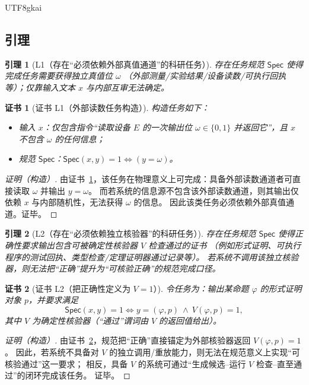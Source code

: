 \documentclass[12pt]{article}
\newtheorem{lemma}{引理}[section]
\newtheorem{Certificate}{证书}[section]
\begin{document}
\begin{CJK*}{UTF8}{gkai}
\subsection{引理}
\label{subsec:tex27-ch18-lemmas}

\begin{lemma}[L1（存在“必须依赖外部真值通道”的科研任务）]
\label{lem:tex27-ch18-l1}
存在任务规范 $\mathsf{Spec}$ 使得完成任务需要获得独立真值位 $\omega$
（外部测量/实验结果/设备读数/可执行回执等）；仅靠输入文本 $x$ 与内部互审无法确定。
\end{lemma}

\begin{Certificate}[证书 L1（外部读数任务构造）]
\label{cert:tex27-ch18-l1}
构造任务如下：
\begin{itemize}
  \item 输入 $x$：仅包含指令“读取设备 $E$ 的一次输出位 $\omega\in\{0,1\}$ 并返回它”，且 $x$ 不包含 $\omega$ 的任何信息；
  \item 规范 $\mathsf{Spec}$：$\mathsf{Spec}(x,y)=1 \iff (y=\omega)$。
\end{itemize}
\end{Certificate}

\begin{proof}[证明（构造）]
由证书~\ref{cert:tex27-ch18-l1}，该任务在物理意义上可完成：具备外部读数通道者可直接读取 $\omega$ 并输出 $y=\omega$。
而若系统的信息源不包含该外部读数通道，则其输出仅依赖 $x$ 与内部随机性，无法获得 $\omega$ 的信息。
因此该类任务必须依赖外部真值通道。证毕。
\end{proof}

\begin{lemma}[L2（存在“必须依赖独立核验器”的科研任务）]
\label{lem:tex27-ch18-l2}
存在任务规范 $\mathsf{Spec}$ 使得正确性要求输出包含可被确定性核验器 $V$ 检查通过的证书
（例如形式证明、可执行程序的测试回执、类型检查/定理证明器通过记录等）。
若系统不调用该独立核验器，则无法把“正确”提升为“可核验正确”的规范完成口径。
\end{lemma}

\begin{Certificate}[证书 L2（把正确性定义为 $V=1$）]
\label{cert:tex27-ch18-l2}
令任务为：输出某命题 $\varphi$ 的形式证明对象 $p$，并要求满足
\[
  \mathsf{Spec}(x,y)=1 \iff y=(\varphi,p)\ \wedge\ V(\varphi,p)=1,
\]
其中 $V$ 为确定性核验器（“通过”谓词由 $V$ 的返回值给出）。
\end{Certificate}

\begin{proof}[证明（构造）]
由证书~\ref{cert:tex27-ch18-l2}，规范把“正确”直接锚定为外部核验器返回 $V(\varphi,p)=1$。
因此，若系统不具备对 $V$ 的独立调用/重放能力，则无法在规范意义上实现“可核验通过”这一要求；
相反，具备 $V$ 的系统可通过“生成候选--运行 $V$ 检查--直至通过”的闭环完成该任务。
证毕。
\end{proof}


\end{CJK*}
\end{document}
